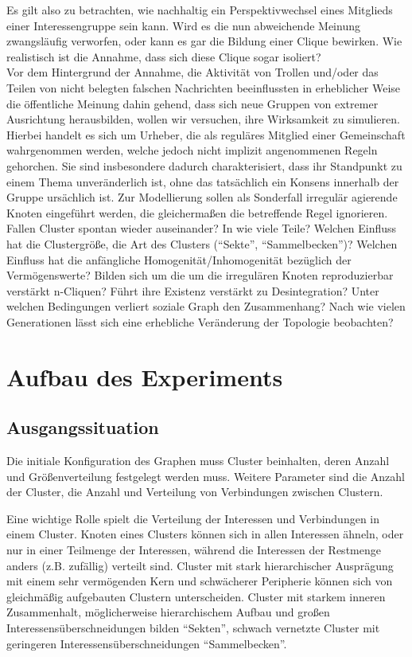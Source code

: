 \documentclass[11pt, a4paper]{scrartcl}
\begin{document}
Es gilt also zu betrachten, wie nachhaltig ein Perspektivwechsel eines Mitglieds einer Interessengruppe sein kann. Wird es die nun abweichende Meinung zwangsläufig verworfen, oder kann es gar die Bildung einer Clique bewirken. Wie realistisch ist die Annahme, dass sich diese Clique sogar isoliert?
\\
Vor dem Hintergrund der Annahme, die Aktivität von Trollen und/oder das Teilen von nicht belegten falschen Nachrichten beeinflussten in erheblicher Weise die öffentliche Meinung dahin gehend, dass sich neue Gruppen von  extremer Ausrichtung herausbilden, wollen wir versuchen, ihre Wirksamkeit zu simulieren.
\\
Hierbei handelt es sich um Urheber, die als reguläres Mitglied einer Gemeinschaft  wahrgenommen werden, welche jedoch nicht implizit angenommenen Regeln gehorchen. Sie sind insbesondere dadurch charakterisiert, dass ihr Standpunkt zu einem Thema unveränderlich ist, ohne das tatsächlich ein Konsens innerhalb der Gruppe ursächlich ist. Zur Modellierung sollen als Sonderfall irregulär agierende Knoten eingeführt werden, die gleichermaßen die betreffende Regel ignorieren.
\\
Fallen Cluster spontan wieder auseinander? In wie viele Teile? Welchen Einfluss hat die Clustergröße, die Art des Clusters ("`Sekte"', "`Sammelbecken"')?
Welchen Einfluss hat die anfängliche Homogenität/Inhomogenität bezüglich der Vermögenswerte? Bilden sich um die um die irregulären Knoten reproduzierbar verstärkt n-Cliquen? Führt ihre Existenz verstärkt zu Desintegration? Unter welchen Bedingungen verliert soziale Graph den Zusammenhang? Nach wie vielen Generationen lässt sich eine erhebliche Veränderung der Topologie beobachten?


\section{Aufbau des Experiments}
\subsection{Ausgangssituation}
Die initiale Konfiguration des Graphen muss Cluster beinhalten, deren Anzahl und Größenverteilung festgelegt werden muss. Weitere Parameter sind die Anzahl der Cluster, die Anzahl und Verteilung von Verbindungen zwischen Clustern.

Eine wichtige Rolle spielt die Verteilung der Interessen und Verbindungen in einem Cluster. Knoten eines Clusters können sich in allen Interessen ähneln, oder nur in einer Teilmenge der Interessen, während die Interessen der Restmenge anders (z.B. zufällig) verteilt sind. Cluster mit stark hierarchischer Ausprägung mit einem sehr vermögenden Kern und schwächerer Peripherie können sich von gleichmäßig aufgebauten Clustern unterscheiden. Cluster mit starkem inneren Zusammenhalt, möglicherweise hierarchischem Aufbau und großen Interessensüberschneidungen bilden "`Sekten"', schwach vernetzte Cluster mit geringeren Interessensüberschneidungen "`Sammelbecken"'.
\end{document}
